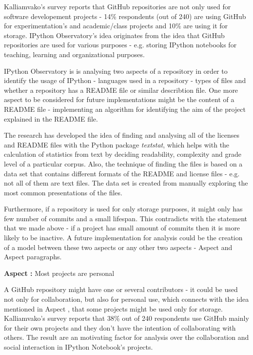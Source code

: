 Kalliamvako's survey\cite{kalliamvakoupromises} reports that GitHub repositories are not only used for software developement projects - 14\% respondents (out of 240) are using GitHub for experimentation's and academic/class projects and 10\% are using it for storage. IPython Observatory's idea originates from the idea that GitHub repositories are used for various purposes - e.g. storing IPython notebooks for teaching, learning and organizational purposes. 

IPython Observatory is is analysing two aspects of a repository in order to identify the usage of IPython - languages used in a repository - types of files and whether a repository has a README file or similar describtion file. One more aspect to be considered for future implementations might be the content of a README file - implementing an algorithm for identifying the aim of the project explained in the README file. 

The research has developed the idea of finding and analysing all of the licenses and README files with the Python package \textit{textstat}\cite{textstat}, which helps with the calculation of statistics from text by deciding readability, complexity and grade level of a particular corpus. Also, the technique of finding the files is based on a data set that contains different formats of the README and license files - e.g. not all of them are text files. The data set is created from manually exploring the most common presentations of the files.

Furthermore, if a repository is used for only storage purposes, it might only has few number of commits and a small lifespan. This contradicts with the statement that we made above - if a project has small amount of commits then it is more likely to be inactive. A future implementation for analysis could be the creation of a model between these two aspects or any other two aspects - Aspect  and Aspect  paragraphs.


\vspace{5mm}
\begin{mdframed}
\vspace{1px}
\textbf{Aspect :}  Most projects are personal
\vspace{1px}
\end{mdframed}
\vspace{2mm}

A GitHub repository might have one or several contributors - it could be used not only for collaboration, but also for personal use, which connects with the idea mentioned in Aspect , that some projects might be used only for storage. Kalliamvako's survey\cite{kalliamvakoupromises} reports that 38\% out of 240 respondents use GitHub mainly for their own projects and they don't have the intention of collaborating with others. The result are an motivating factor for analysis over the collaboration and social interaction in IPython Notebook's projects. 

